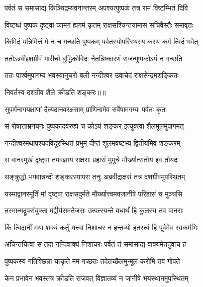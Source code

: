 \twolineshloka
{पर्वतं स समासाद्य किञ्चिद्रम्यवनान्तरम्}
{अपश्यत्पुष्पकं तत्र राम विष्टम्भितं दिवि} %

\twolineshloka
{विष्टब्धं पुष्पकं दृष्ट्वा कामगं ह्यगमं कृतम्}
{राक्षसश्चिन्तयामास सचिवैस्तैः समावृतः} %

\twolineshloka
{किमिदं यन्निमित्तं मे न च गच्छति पुष्पकम्}
{पर्वतस्योपरिस्थस्य कस्य कर्म त्विदं भवेत्} %

\twolineshloka
{ततोऽब्रवीद्दशग्रीवं मारीचो बुद्धिकोविदः}
{नैतन्निष्कारणं राजन्पुष्पकोऽयं न गच्छति} %

\twolineshloka
{ततः पार्श्वमुपागम्य भवस्यानुचरो बली}
{नन्दीश्वर उवाचेदं राक्षसेन्द्रमशङ्कितः} %

{निवर्तस्व दशग्रीव शैले क्रीडति शङ्करः॥॥} %

\addtocounter{shlokacount}{1}

\twolineshloka
{सुपर्णनागयक्षाणां दैत्यदानवरक्षसाम्}
{प्राणिनामेव सर्वेषामगम्यः पर्वतः कृतः} %

\twolineshloka
{स रोषात्ताम्रनयनः पुष्पकादवरुह्य च}
{कोऽयं शङ्कर इत्युक्त्वा शैलमूलमुपागमत्} %

\twolineshloka
{नन्दीश्वरमथापश्यदविदूरस्थितं प्रभुम्}
{दीप्तं शूलमवष्टभ्य द्वितीयमिव शङ्करम्} %

\twolineshloka
{स वानरमुखं दृष्ट्वा तमवज्ञाय राक्षसः}
{प्रहासं मुमुचे मौर्ख्यात्सतोय इव तोयदः} %

\twolineshloka
{सङ्क्रुद्धो भगवान्नन्दी शङ्करस्यापरा तनुः}
{अब्रवीद्राक्षसं तत्र दशग्रीवमुपस्थितम्} %

\twolineshloka
{यस्माद्वानरमूर्तिं मां दृष्ट्वा राक्षसदुर्मते}
{मौर्ख्यात्त्वमवजानीषे परिहासं च मुञ्चसि} %

\twolineshloka
{तस्मान्मद्रूपसंयुक्ता मद्वीर्यसमतेजसः}
{उत्पत्स्यन्ते वधार्थं हि कुलस्य तव वानराः} %

\twolineshloka
{किं त्विदानीं मया शक्यं कर्तुं यत्त्वां निशाचर}
{न हन्तव्यो हतस्त्वं हि पूर्वमेव स्वकर्मभिः} %

\twolineshloka
{अचिन्तयित्वा स तदा नन्दिवाक्यं निशाचरः}
{पर्वतं तं समासाद्य वाक्यमेतदुवाच ह} %

\twolineshloka
{पुष्पकस्य गतिश्छिन्ना यत्कृते मम गच्छतः}
{तदेतच्छैलमुन्मूलं करोमि तव गोपते} %

\twolineshloka
{केन प्रभावेन भवस्तत्र क्रीडति राजवत्}
{विज्ञातव्यं न जानीषे भयस्थानमुपस्थितम्} %

